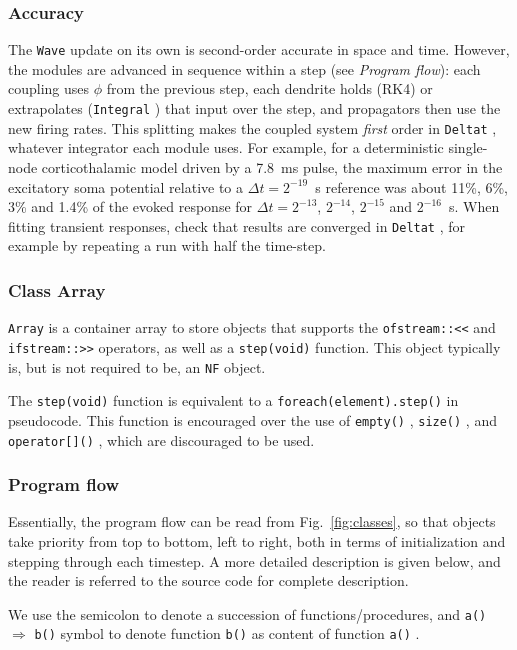 \documentclass[12pt,a4paper]{article}
\newcommand{\type}[1]{{\small\small\tt #1} }
\begin{document}
\subsubsection{Accuracy}
The \type{Wave} update on its own is second-order accurate in space and time.
However, the modules are advanced in sequence within a step (see \emph{Program flow}): each coupling uses \(\phi\) from the previous step, each dendrite holds (RK4) or extrapolates (\type{Integral}) that input over the step, and propagators then use the new firing rates.
This splitting makes the coupled system \emph{first} order in \type{Deltat}, whatever integrator each module uses.
For example, for a deterministic single-node corticothalamic model driven by a 7.8~ms pulse, the maximum error in the excitatory soma potential relative to a \(\Delta t = 2^{-19}\)~s reference was about 11\%, 6\%, 3\% and 1.4\% of the evoked response for \(\Delta t = 2^{-13}\), \(2^{-14}\), \(2^{-15}\) and \(2^{-16}\)~s.
When fitting transient responses, check that results are converged in \type{Deltat}, for example by repeating a run with half the time-step.

\subsubsection{Class Array}
\label{sec:array}

\type{Array} is a container array to store objects that supports the \type{ofstream::<<} and \type{ifstream::>>} operators, as well as a \type{step(void)} function. This object typically is, but is not required to be, an \type{NF} object.

The \type{step(void)} function is equivalent to a \type{foreach(element).step()} in pseudocode. This function is encouraged over the use of \type{empty()}, \type{size()}, and \type{operator[]()}, which are discouraged to be used.

\subsubsection{Program flow}

Essentially, the program flow can be read from Fig.~\ref{fig:classes}, so that objects take priority from top to bottom, left to right, both in terms of initialization and stepping through each timestep. A more detailed description is given below, and the reader is referred to the source code for complete description.

We use the semicolon to denote a succession of functions/procedures, and \type{a()} $\Rightarrow$ \type{b()} symbol to denote function \type{b()} as content of function \type{a()}.
\end{document}
